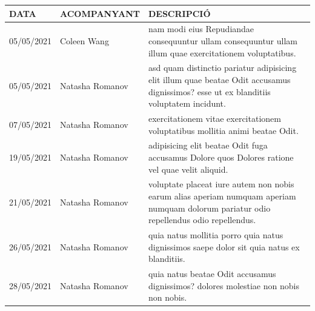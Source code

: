 \documentclass[a4paper,12pt]{elsarticle}  %
\begin{document}
	\begin{longtable}{p{}lp{}}
		

		
		\hline
		\textbf{DATA} & \textbf{ACOMPANYANT} & \textbf{DESCRIPCIÓ}\\
		\hline
			 05/05/2021 & Coleen Wang & nam modi eius Repudiandae consequuntur ullam consequuntur ullam illum quae exercitationem voluptatibus. \\ 
			 05/05/2021 & Natasha Romanov & asd quam distinctio pariatur adipisicing elit illum quae beatae Odit accusamus dignissimos? esse ut ex blanditiis voluptatem incidunt. \\ 
			 07/05/2021 & Natasha Romanov & exercitationem vitae exercitationem voluptatibus mollitia animi beatae Odit. \\ 
			 19/05/2021 & Natasha Romanov & adipisicing elit beatae Odit fuga accusamus Dolore quos Dolores ratione vel quae velit aliquid. \\ 
			 21/05/2021 & Natasha Romanov & voluptate placeat iure autem non nobis earum alias aperiam numquam aperiam numquam dolorum pariatur odio repellendus odio repellendus. \\ 
			 26/05/2021 & Natasha Romanov & quia natus mollitia porro quia natus dignissimos saepe dolor sit quia natus ex blanditiis. \\ 
			 28/05/2021 & Natasha Romanov & quia natus beatae Odit accusamus dignissimos? dolores molestiae non nobis non nobis. \\ 
		
	\end{longtable}
\end{document}
